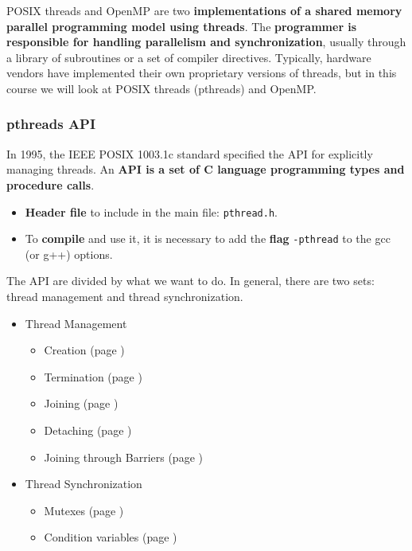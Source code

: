 \noindent
POSIX threads and OpenMP are two \textbf{implementations of a shared memory parallel programming model using threads}. The \textbf{programmer is responsible for handling parallelism and synchronization}, usually through a library of subroutines or a set of compiler directives. Typically, hardware vendors have implemented their own proprietary versions of threads, but in this course we will look at POSIX threads (pthreads) and OpenMP.

\newpage

\subsubsection{pthreads API}

In 1995, the IEEE POSIX 1003.1c standard specified the API for explicitly managing threads. An \textbf{API is a set of C language programming types and procedure calls}.
\begin{itemize}
    \item \textbf{Header file} to include in the main file: \texttt{pthread.h}.
    \item To \textbf{compile} and use it, it is necessary to add the \textbf{flag} \texttt{-pthread} to the gcc (or g++) options.
\end{itemize}
The API are divided by what we want to do. In general, there are two sets: thread management and thread synchronization.
\begin{itemize}
    \item Thread Management
    \begin{itemize}
        \item Creation (page \pageref{paragraph: Creation})
        \item Termination (page \pageref{paragraph: Termination})
        \item Joining (page \pageref{paragraph: Joining})
        \item Detaching (page \pageref{paragraph: Detaching})
        \item Joining through Barriers (page \pageref{paragraph: Joining through Barriers})
    \end{itemize}
    \item Thread Synchronization
    \begin{itemize}
        \item Mutexes (page \pageref{paragraph: Mutexes})
        \item Condition variables (page \pageref{paragraph: Condition variables})
    \end{itemize}
\end{itemize}

